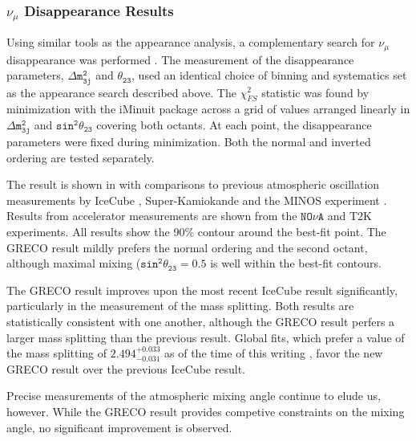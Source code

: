 \label{subsubsec:disappearance_results}
\subsubsection{$\nu_\mu$ Disappearance Results}
Using similar tools as the appearance analysis, a complementary search for $\mathtt{\nu_\mu}$ disappearance was performed .
The measurement of the disappearance parameters, $\mathtt{\Delta m^2_{3j}}$ and $\mathtt{\theta_{23}}$, used an identical choice of binning and systematics set as the appearance search described above.
The $\chi^2_{FS}$ statistic was found by minimization with the iMinuit package  across a grid of values arranged linearly in $\mathtt{\Delta m^2_{3j}}$ and $\mathtt{sin^2\theta_{23}}$ covering both octants.
At each point, the disappearance parameters were fixed during minimization.
Both the normal and inverted ordering are tested separately.

The result is shown in  with comparisons to previous atmospheric oscillation measurements by IceCube , Super-Kamiokande  and the MINOS experiment .
Results from accelerator measurements are shown from the $\mathtt{NO\nu A}$  and T2K  experiments.
All results show the 90\% contour around the best-fit point.
The GRECO result mildly prefers the normal ordering and the second octant, although maximal mixing ($\mathtt{sin^2\theta_{23}=0.5}$ is well within the best-fit contours.

The GRECO result improves upon the most recent IceCube result significantly, particularly in the measurement of the mass splitting.
Both results are statistically consistent with one another, although the GRECO result perfers a larger mass splitting than the previous result.
Global fits, which prefer a value of the mass splitting of $\mathtt{2.494^{+0.033}_{-0.031}}$ as of the time of this writing , favor the new GRECO result over the previous IceCube result.

Precise measurements of the atmospheric mixing angle continue to elude us, however.
While the GRECO result provides competive constraints on the mixing angle, no significant improvement is observed.

\label{subsubsec:nmo_results}

